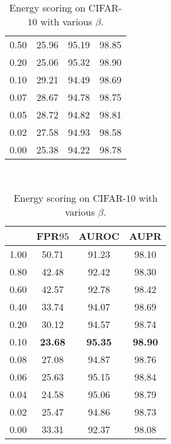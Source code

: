 \documentclass{article}
\begin{document}
\begin{table}[t]
{{\begin{tabular}{c|ccc}
0.50               & 25.96                  & 95.19                  & 98.85 \\
0.20               & 25.06                  & 95.32                  & 98.90 \\
0.10               & 29.21                  & 94.49                  & 98.69 \\
0.07               & 28.67                  & 94.78                  & 98.75 \\
0.05               & 28.72                  & 94.82                  & 98.81 \\ 
0.02               & 27.58                  & 94.93                  & 98.58 \\
0.00               & 25.38                  & 94.22                  & 98.78 \\
\bottomrule[1.5pt]      
\end{tabular}
}
}~~
\parbox{.30\linewidth}{
\centering
\caption{Energy scoring on CIFAR-$10$  with various  $\beta$.} 
\scriptsize
\vspace{5pt}
{
\begin{tabular}{c|ccc}
\toprule[1.5pt]
            & FPR$95$     & AUROC       & AUPR     \\
\midrule[0.6pt]
1.00               & 50.71                  & 91.23                  & 98.10 \\
0.80               & 42.48                  & 92.42                  & 98.30 \\
0.60               & 42.57                  & 92.78                  & 98.42 \\
0.40               & 33.74                  & 94.07                  & 98.69 \\
0.20               & 30.12                  & 94.57                  & 98.74 \\
\cellcolor{greyC}0.10               & \cellcolor{greyC}\textbf{23.68}                  & \cellcolor{greyC}\textbf{95.35}                  & \cellcolor{greyC}\textbf{98.90} \\
0.08               & 27.08                  & 94.87                  & 98.76 \\
0.06               & 25.63                  & 95.15                  & 98.84 \\
0.04               & 24.58                  & 95.06                  & 98.79 \\
0.02               & 25.47                  & 94.86                  & 98.73 \\
0.00               & 33.31                  & 92.37                  & 98.08 \\
\bottomrule[1.5pt]      
\end{tabular}
}
}
\end{table}
\end{document}
